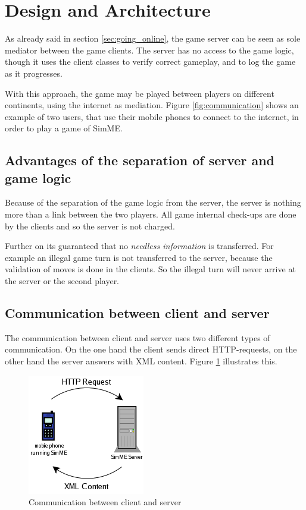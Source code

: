 \section{Design and Architecture} \label{sec:architecture}

	As already said in section \ref{sec:going_online}, the game server can be
	seen as sole mediator between the game clients. The server has no access to
	the game logic, though it uses the client classes to verify correct
	gameplay, and to log the game as it progresses.

	With this approach, the game may be played between players on different
	continents, using the internet as mediation. Figure \ref{fig:communication}
	shows an example of two users, that use their mobile phones to connect to
	the internet, in order to play a game of SimME.

	\subsection{Advantages of the separation of server and game logic}

		Because of the separation of the game logic from the server, the server
		is nothing more than a link between the two players. All game internal
		check-ups are done by the clients and so the server is not charged.

		Further on its guaranteed that no \textit{needless information} is
		transferred. For example an illegal game turn is not transferred to the
		server, because the validation of moves is done in the clients. So the
		illegal turn will never arrive at the server or the second player.

	\subsection{Communication between client and server}

		The communication between client and server uses two different types of
		communication. On the one hand the client sends direct HTTP-requests, on
		the other hand the server answers with XML content. Figure
		\ref{fig:com_client_server} illustrates this.

		\begin{figure}[h]
		\begin{center}
			\includegraphics{pics/com_client_server.png}
			\caption{Communication between client and server}
			\label{fig:com_client_server}
		\end{center}
		\end{figure}

